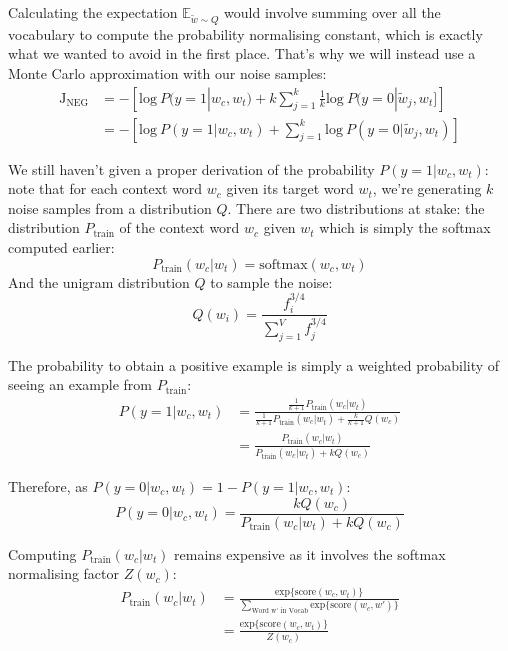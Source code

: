 Calculating the expectation $\mathbb{E}_{\tilde{w}\sim Q}$ would involve summing over all the vocabulary to compute the probability normalising constant, which is exactly what we wanted to avoid in the first place. That's why we will instead use a Monte Carlo approximation with our noise samples:
\begin{align}
    \text{J}_{\text{NEG}}  &= -\left[\text{log}~P(y=1| w_c, w_t) + k\sum_{j=1}^{k}\frac{1}{k}\text{log}~P(y=0|\tilde{w}_j, w_t]\right]\nonumber \\
     &= -\left[\text{log}~P(y=1| w_c, w_t) + \sum_{j=1}^k\text{log}~P(y=0|\tilde{w}_j, w_t)\right]
\end{align}

We still haven't given a proper derivation of the probability $P(y=1| w_c, w_t)$: note that for each context word $w_c$ given its target word $w_t$, we're generating $k$ noise samples from a distribution $Q$. There are two distributions at stake: the distribution $P_{\text{train}}$ of the context word $w_c$ given $w_t$ which is simply the softmax computed earlier:
\begin{equation}
    P_{\text{train}}(w_c|w_t) = \text{softmax}(w_c, w_t)
\end{equation}
And the unigram distribution $Q$ to sample the noise:
\begin{equation}
    Q(w_i) = \frac{f_i^{3/4}}{\sum_{j=1}^V f_j^{3/4}}
\end{equation}

The probability to obtain a positive example is simply a weighted probability of seeing an example from $P_{\text{train}}$:
\begin{align}
    P(y=1| w_c, w_t) &= \frac{\frac{1}{k+1}P_{\text{train}}(w_c|w_t)}{\frac{1}{k+1}P_{\text{train}}(w_c|w_t) + \frac{k}{k+1}Q(w_c)}\nonumber \\
     &= \frac{P_{\text{train}}(w_c|w_t)}{P_{\text{train}}(w_c|w_t) + kQ(w_c)}
\end{align}

Therefore, as $P(y=0| w_c, w_t) = 1 - P(y=1| w_c, w_t)$:
\begin{equation}
    P(y=0| w_c, w_t) = \frac{kQ(w_c)}{P_{\text{train}}(w_c|w_t) + kQ(w_c)}
\end{equation}

Computing $P_{\text{train}}(w_c|w_t)$ remains expensive as it involves the softmax normalising factor $Z(w_c)$:
\begin{align}
    P_{\text{train}}(w_c|w_t) &= \frac{\text{exp}\{\text{score}(w_c, w_t)\}}{\sum_{\text{Word w' in Vocab}}\text{exp}\{\text{score}(w_c, w')\}} \nonumber \\
     &= \frac{\text{exp}\{\text{score}(w_c, w_t)\}}{Z(w_c)}
\end{align}

